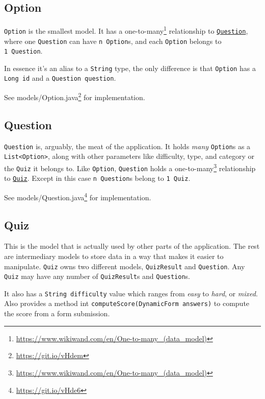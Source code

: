\documentclass[english,a4paper,]{report}
\renewcommand{\href}[2]{#2\footnote{\url{#1}}}
\begin{document}
\subsection{Option}\label{option}

\texttt{Option} is the smallest model. It has a
\href{https://www.wikiwand.com/en/One-to-many_(data_model)}{one-to-many}
relationship to \protect\hyperlink{question}{\texttt{Question}}, where
one \texttt{Question} can have \texttt{n\ Option}s, and each
\texttt{Option} belongs to \texttt{1\ Question}.

In essence it's an alias to a \texttt{String} type, the only difference
is that \texttt{Option} has a \texttt{Long\ id} and a
\texttt{Question\ question}.

See \href{https://git.io/vHdem}{models/Option.java} for implementation.

\hypertarget{question}{\subsection{Question}\label{question}}

\texttt{Question} is, arguably, the meat of the application. It holds
\emph{many} \texttt{Option}s as a
\texttt{List\textless{}Option\textgreater{}}, along with other
parameters like difficulty, type, and category or the \texttt{Quiz} it
belongs to. Like \texttt{Option}, \texttt{Question} holds a
\href{https://www.wikiwand.com/en/One-to-many_(data_model)}{one-to-many}
relationship to \protect\hyperlink{quiz}{\texttt{Quiz}}. Except in this
case \texttt{n\ Question}s belong to \texttt{1\ Quiz}.

See \href{https://git.io/vHde6}{models/Question.java} for
implementation.

\hypertarget{quiz}{\subsection{Quiz}\label{quiz}}

This is the model that is actually used by other parts of the
application. The rest are intermediary models to store data in a way
that makes it easier to manipulate. \texttt{Quiz} owns two different
models, \texttt{QuizResult} and \texttt{Question}. Any \texttt{Quiz} may
have any number of \texttt{QuizResult}s and \texttt{Question}s.

It also has a \texttt{String\ difficulty} value which ranges from
\emph{easy} to \emph{hard}, or \emph{mixed}. Also provides a method int
\texttt{computeScore(DynamicForm\ answers)} to compute the score from a
form submission.
\end{document}
